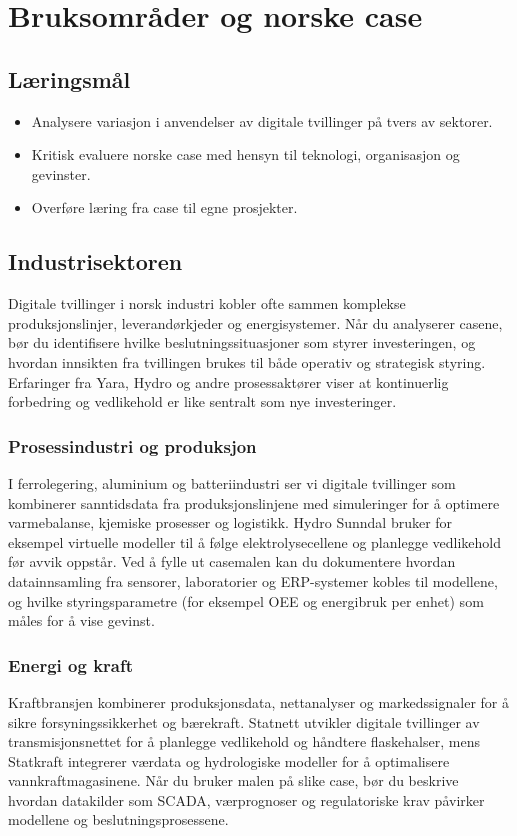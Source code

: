 \chapter{Bruksområder og norske case}

\section{Læringsmål}
\begin{itemize}
    \item Analysere variasjon i anvendelser av digitale tvillinger på tvers av sektorer.
    \item Kritisk evaluere norske case med hensyn til teknologi, organisasjon og gevinster.
    \item Overføre læring fra case til egne prosjekter.
\end{itemize}

\section{Industrisektoren}
Digitale tvillinger i norsk industri kobler ofte sammen komplekse produksjonslinjer, leverandørkjeder og energisystemer. Når du analyserer casene, bør du identifisere hvilke beslutningssituasjoner som styrer investeringen, og hvordan innsikten fra tvillingen brukes til både operativ og strategisk styring. Erfaringer fra Yara, Hydro og andre prosessaktører viser at kontinuerlig forbedring og vedlikehold er like sentralt som nye investeringer.

\subsection*{Prosessindustri og produksjon}
I ferrolegering, aluminium og batteriindustri ser vi digitale tvillinger som kombinerer sanntidsdata fra produksjonslinjene med simuleringer for å optimere varmebalanse, kjemiske prosesser og logistikk. Hydro Sunndal bruker for eksempel virtuelle modeller til å følge elektrolysecellene og planlegge vedlikehold før avvik oppstår. Ved å fylle ut casemalen kan du dokumentere hvordan datainnsamling fra sensorer, laboratorier og ERP-systemer kobles til modellene, og hvilke styringsparametre (for eksempel OEE og energibruk per enhet) som måles for å vise gevinst.

\subsection*{Energi og kraft}
Kraftbransjen kombinerer produksjonsdata, nettanalyser og markedssignaler for å sikre forsyningssikkerhet og bærekraft. Statnett utvikler digitale tvillinger av transmisjonsnettet for å planlegge vedlikehold og håndtere flaskehalser, mens Statkraft integrerer værdata og hydrologiske modeller for å optimalisere vannkraftmagasinene. Når du bruker malen på slike case, bør du beskrive hvordan datakilder som SCADA, værprognoser og regulatoriske krav påvirker modellene og beslutningsprosessene.

